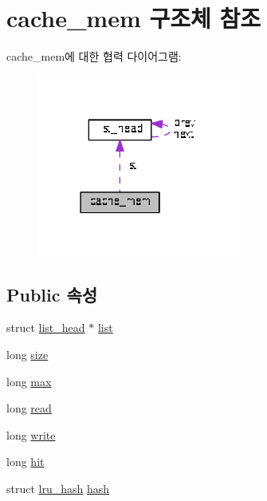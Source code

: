 \hypertarget{structcache__mem}{\section{cache\+\_\+mem 구조체 참조}
\label{structcache__mem}
}


cache\+\_\+mem에 대한 협력 다이어그램\+:
\nopagebreak
\begin{figure}[H]
\begin{center}
\leavevmode
\includegraphics[width=190pt]{structcache__mem__coll__graph}
\end{center}
\end{figure}
\subsection*{Public 속성}
\begin{DoxyCompactItemize}
\item 
struct \hyperlink{structlist__head}{list\+\_\+head} $\ast$ \hyperlink{structcache__mem_a785dde86afb87f8825779f50e29d6bd7}{list}
\item 
long \hyperlink{structcache__mem_a58c6a91c40d59398a3ed18daccc448fc}{size}
\item 
long \hyperlink{structcache__mem_aca41dfab3073387e6c6063457a17f616}{max}
\item 
long \hyperlink{structcache__mem_af64061b621392a1872f5cb92dde7dc7c}{read}
\item 
long \hyperlink{structcache__mem_adb5a0315176779908235c7ed3e41ec57}{write}
\item 
long \hyperlink{structcache__mem_a2b8742701cf4beaff0639d36d52209d9}{hit}
\item 
struct \hyperlink{structlru__hash}{lru\+\_\+hash} \hyperlink{structcache__mem_a33b5307112f19826b77d6bcaf8044638}{hash}
\end{DoxyCompactItemize}


